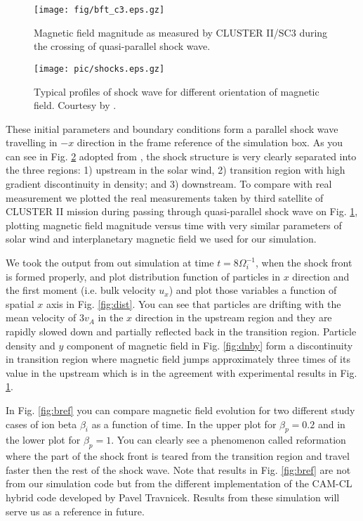 \documentclass[oneside,branding,toc,article]{satdoc}
\begin{document}
\begin{figure}[!h]
  \centering
  \texttt{[image: fig/bft\_c3.eps.gz]}
  \caption{Magnetic field magnitude as measured by CLUSTER II/SC3 during the
    crossing of quasi-parallel shock wave.}
  \label{fig:cluster}
\end{figure}
\begin{figure}[!h]
  \centering
  \texttt{[image: pic/shocks.eps.gz]}
  \caption{Typical profiles of shock wave for different orientation of magnetic
    field. Courtesy by \cite{bt96}. }
  \label{fig:shocks}
\end{figure}

These initial parameters and boundary conditions form a parallel shock wave
travelling in $-x$ direction in the frame reference of the simulation box. As
you can see in Fig. \ref{fig:shocks} adopted from \cite{bt96}, the shock
structure is very clearly separated into the three regions: 1) upstream in the
solar wind, 2) transition region with high gradient discontinuity in density;
and 3) downstream.  To compare with real measurement we plotted the real
measurements taken by third satellite of CLUSTER II mission during passing
through quasi-parallel shock wave on Fig. \ref{fig:cluster}, plotting magnetic
field magnitude versus time with very similar parameters of solar wind and
interplanetary magnetic field we used for our simulation.

We took the output from out simulation at time $t=8 \Omega_i^{-1}$, when the
shock front is formed properly, and plot distribution function of particles in
$x$ direction and the first moment (i.e. bulk velocity $u_x$) and plot those
variables a function of spatial $x$ axis in Fig. \ref{fig:dist}.  You can see
that particles are drifting with the mean velocity of $3 v_A$ in the $x$
direction in the upstream region and they are rapidly slowed down and partially
reflected back in the transition region.  Particle density and $y$ component of
magnetic field in Fig. \ref{fig:dnby} form a discontinuity in transition region
where magnetic field jumps approximately three times of its value in the
upstream which is in the agreement with experimental results in
Fig. \ref{fig:cluster}.

In Fig. \ref{fig:bref} you can compare magnetic field evolution for two
different study cases of ion beta $\beta_i$ as a function of time.  In the
upper plot for $\beta_p = 0.2$ and in the lower plot for $\beta_p = 1$.  You
can clearly see a phenomenon called reformation where the part of the shock
front is teared from the transition region and travel faster then the rest of
the shock wave.  Note that results in Fig. \ref{fig:bref} are not from our
simulation code but from the different implementation of the CAM-CL hybrid code
developed by Pavel Travnicek.  Results from these simulation will serve us as a
reference in future.
\end{document}
